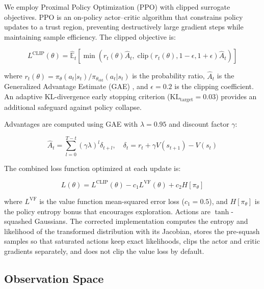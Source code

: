 \documentclass[conference]{IEEEtran}
\begin{document}
We employ Proximal Policy Optimization (PPO) \cite{b14} with clipped surrogate objectives. PPO is an on-policy actor--critic algorithm that constrains policy updates to a trust region, preventing destructively large gradient steps while maintaining sample efficiency. The clipped objective is:

\begin{equation}
L^{\text{CLIP}}(\theta) = \hat{\mathbb{E}}_t \left[ \min\!\left( r_t(\theta) \hat{A}_t,\; \text{clip}(r_t(\theta), 1{-}\epsilon, 1{+}\epsilon) \hat{A}_t \right) \right]
\label{eq:ppo_clip}
\end{equation}

\noindent where $r_t(\theta) = \pi_\theta(a_t | s_t) / \pi_{\theta_{\text{old}}}(a_t | s_t)$ is the probability ratio, $\hat{A}_t$ is the Generalized Advantage Estimate (GAE) \cite{b15}, and $\epsilon = 0.2$ is the clipping coefficient. An adaptive KL-divergence early stopping criterion ($\text{KL}_{\text{target}} = 0.03$) provides an additional safeguard against policy collapse.

Advantages are computed using GAE with $\lambda = 0.95$ and discount factor $\gamma$:

\begin{equation}
\hat{A}_t = \sum_{l=0}^{T-t} (\gamma \lambda)^l \delta_{t+l}, \quad \delta_t = r_t + \gamma V(s_{t+1}) - V(s_t)
\label{eq:gae}
\end{equation}

The combined loss function optimized at each update is:

\begin{equation}
L(\theta) = L^{\text{CLIP}}(\theta) - c_1 L^{\text{VF}}(\theta) + c_2 H[\pi_\theta]
\label{eq:total_loss}
\end{equation}

\noindent where $L^{\text{VF}}$ is the value function mean-squared error loss ($c_1 = 0.5$), and $H[\pi_\theta]$ is the policy entropy bonus that encourages exploration. Actions are $\tanh$-squashed Gaussians. The corrected implementation computes the entropy and likelihood of the transformed distribution with its Jacobian, stores the pre-squash samples so that saturated actions keep exact likelihoods, clips the actor and critic gradients separately, and does not clip the value loss by default.

\subsection{Observation Space}
\end{document}
